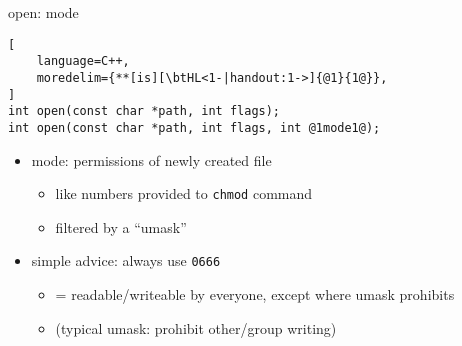 \begin{frame}[fragile,label=modeExplain]{open: mode}
\begin{lstlisting}[
    language=C++,
    moredelim={**[is][\btHL<1-|handout:1->]{@1}{1@}},
]
int open(const char *path, int flags);
int open(const char *path, int flags, int @1mode1@);
\end{lstlisting}
\begin{itemize}
\item mode: permissions of newly created file
    \begin{itemize}
    \item like numbers provided to \texttt{chmod} command
    \item filtered by a ``umask''
    \end{itemize}
\item simple advice: always use \texttt{0666}
    \begin{itemize}
    \item = readable/writeable by everyone, except where umask prohibits
    \item (typical umask: prohibit other/group writing)
    \end{itemize}
\end{itemize}
\end{frame}
